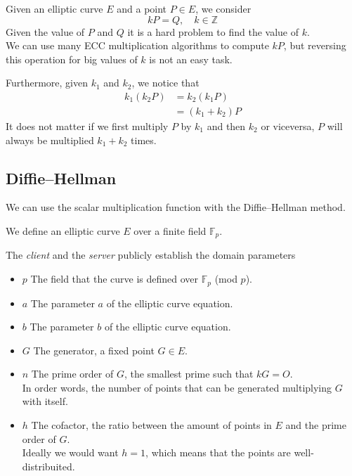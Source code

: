 \documentclass{article}
\begin{document}
Given an elliptic curve \(E\) and a point \(P\in E\), we consider
\[
	kP=Q,\quad
	k\in\mathbb{Z}
\]
Given the value of \(P\) and \(Q\) it is a hard problem to find the value of \(k\).\\
We can use many ECC multiplication algorithms to compute \(kP\), but reversing this operation for big values of \(k\) is not an easy task.

Furthermore, given \(k_1\) and \(k_2\), we notice that
\begin{align*}
	k_1(k_2P)&=k_2(k_1P)\\
	&=(k_1+k_2)P
\end{align*}
It does not matter if we first multiply \(P\) by \(k_1\) and then \(k_2\) or viceversa, \(P\) will always be multiplied \(k_1+k_2\) times.

\subsection{Diffie–Hellman}

We can use the scalar multiplication function with the Diffie–Hellman method.

We define an elliptic curve \(E\) over a finite field \(\mathbb{F}_p\).

The \textit{client} and the \textit{server} publicly establish the domain parameters
\begin{itemize}
	\item \(p\) The field that the curve is defined over \(\mathbb{F}_p\) (mod \(p\)).
	\item \(a\) The parameter \(a\) of the elliptic curve equation.
	\item \(b\) The parameter \(b\) of the elliptic curve equation.
	\item \(G\) The generator, a fixed point \(G\in E\).
	\item \(n\) The prime order of \(G\), the smallest prime such that \(kG=O\).\\In order words, the number of points that can be generated multiplying \(G\) with itself.
	\item \(h\) The cofactor, the ratio between the amount of points in \(E\) and the prime order of \(G\).\\Ideally we would want \(h=1\), which means that the points are well-distribuited.
\end{itemize}
\end{document}
